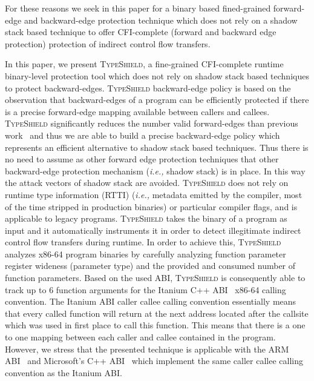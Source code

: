 For these reasons we seek in this paper for a binary based fined-grained forward-edge and backward-edge protection technique which does not rely on a
shadow stack based technique to offer CFI-complete (forward and backward edge protection) protection of indirect control flow transfers.

In this paper, we present \textsc{TypeShield}, a fine-grained CFI-complete runtime 
binary-level protection tool which does not rely on shadow stack based techniques to protect backward-edges.
\textsc{TypeShield} backward-edge policy is based on the observation that backward-edges of a program can be efficiently protected
if there is a precise forward-edge mapping available between callers and callees.
\textsc{TypeShield} significantly reduces the number valid forward-edges than previous work~\cite{veen:typearmor} and thus we are able 
to build a precise backward-edge policy which represents an efficient alternative to shadow stack based techniques.
Thus there is no need to assume as other forward edge protection techniques that other backward-edge protection mechanism (\textit{i.e.,} shadow stack) is in place. In this way the 
attack vectors of shadow stack are avoided.
\textsc{TypeShield} does not rely on runtime type information (RTTI) (\textit{i.e.,} metadata emitted by the compiler, most of the time stripped in production binaries) or particular compiler flags, and is applicable to legacy programs.
\textsc{TypeShield} takes the binary of a program as input and it automatically instruments it in order to detect illegitimate indirect control flow transfers during runtime. 
In order to achieve this, 
\textsc{TypeShield} analyzes x86-64 program binaries by carefully analyzing function parameter register wideness (parameter type) and the provided and consumed number of function parameters. 
Based on the used ABI, \textsc{TypeShield} is consequently able to track up to 6 function arguments for the Itanium C++ ABI~\cite{itanium:abi} x86-64 calling convention. 
The Itanium ABI caller callee calling convention essentially means that every called function will return at the next address located after the callsite which was 
used in first place to call this function. This means that there is a one to one mapping between each caller and callee contained in the program.
However, we stress that the presented technique is applicable with the ARM ABI~\cite{arm:abi} and Microsoft's C++ ABI~\cite{microsoft:abi} 
which implement the same caller callee calling convention as the Itanium ABI.

